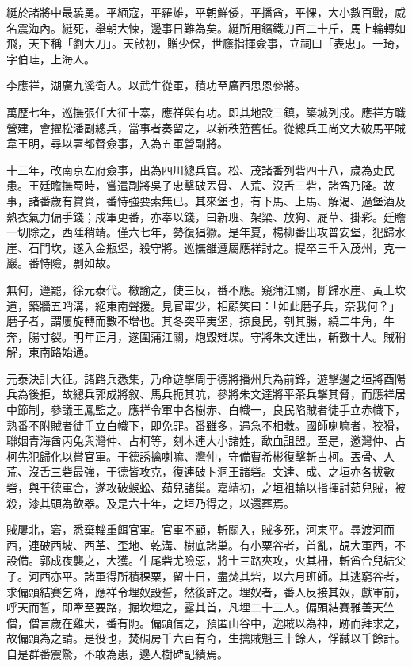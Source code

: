 \begin{pinyinscope}
綎於諸將中最驍勇。平緬寇，平羅雄，平朝鮮倭，平播酋，平惈，大小數百戰，威名震海內。綎死，舉朝大悚，邊事日難為矣。綎所用鑌鐵刀百二十斤，馬上輪轉如飛，天下稱「劉大刀」。天啟初，贈少保，世廕指揮僉事，立祠曰「表忠」。一琦，字伯珪，上海人。

李應祥，湖廣九溪衛人。以武生從軍，積功至廣西思恩參將。

萬歷七年，巡撫張任大征十寨，應祥與有功。即其地設三鎮，築城列戍。應祥方職營建，會擢松潘副總兵，當事者奏留之，以新秩蒞舊任。從總兵王尚文大破馬平賊韋王明，尋以署都督僉事，入為五軍營副將。

十三年，改南京左府僉事，出為四川總兵官。松、茂諸番列砦四十八，歲為吏民患。王廷瞻撫蜀時，嘗遣副將吳子忠擊破丟骨、人荒、沒舌三砦，諸酋乃降。故事，諸番歲有賞賚，番恃強要索無已。其來堡也，有下馬、上馬、解渴、過堡酒及熱衣氣力偏手錢；戍軍更番，亦奉以錢，曰新班、架梁、放狗、屣草、掛彩。廷瞻一切除之，西陲稍靖。僅六七年，勢復猖獗。是年夏，楊柳番出攻普安堡，犯歸水崖、石門坎，遂入金瓶堡，殺守將。巡撫雒遵屬應祥討之。提卒三千入茂州，克一巖。番恃險，剽如故。

無何，遵罷，徐元泰代。檄諭之，使三反，番不應。窺蒲江關，斷歸水崖、黃土坎道，築牆五哨溝，絕東南聲援。見官軍少，相顧笑曰：「如此磨子兵，奈我何？」磨子者，謂屢旋轉而數不增也。其冬突平夷堡，掠良民，刳其腸，繞二牛角，牛奔，腸寸裂。明年正月，遂圍蒲江關，炮毀雉堞。守將朱文達出，斬數十人。賊稍解，東南路始通。

元泰決計大征。諸路兵悉集，乃命遊擊周于德將播州兵為前鋒，遊擊邊之垣將酉陽兵為後拒，故總兵郭成將敘、馬兵扼其吭，參將朱文達將平茶兵擊其脅，而應祥居中節制，參議王鳳監之。應祥令軍中各樹赤、白幟一，良民陷賊者徒手立赤幟下，熟番不附賊者徒手立白幟下，即免罪。番雖多，遇急不相救。國師喇嘛者，狡猾，聯姻青海酋丙兔與灣仲、占柯等，刻木連大小諸姓，歃血詛盟。至是，邀灣仲、占柯先犯歸化以嘗官軍。于德誘擒喇嘛、灣仲，守備曹希彬復擊斬占柯。丟骨、人荒、沒舌三砦最強，于德皆攻克，復連破卜洞王諸砦。文達、成、之垣亦各拔數砦，與于德軍合，遂攻破蜈蚣、茹兒諸巢。嘉靖初，之垣祖輪以指揮討茹兒賊，被殺，漆其頭為飲器。及是六十年，之垣乃得之，以還葬焉。

賊屢北，窘，悉棄輜重餌官軍。官軍不顧，斬關入，賊多死，河東平。尋渡河而西，連破西坡、西革、歪地、乾溝、樹底諸巢。有小粟谷者，首亂，覘大軍西，不設備。郭成夜襲之，大獲。牛尾砦尤險惡，將士三路夾攻，火其柵，斬酋合兒結父子。河西亦平。諸軍得所積稞粟，留十日，盡焚其砦，以六月班師。其逃窮谷者，求偏頭結賽乞降，應祥令埋奴設誓，然後許之。埋奴者，番人反接其奴，獻軍前，呼天而誓，即牽至要路，掘坎埋之，露其首，凡埋二十三人。偏頭結賽雅善天竺僧，僧言歲在雞犬，番有阨。偏頭信之，預匿山谷中，逸賊以為神，跡而拜求之，故偏頭為之請。是役也，焚碉房千六百有奇，生擒賊魁三十餘人，俘馘以千餘計。自是群番震驚，不敢為患，邊人樹碑記績焉。


\end{pinyinscope}
